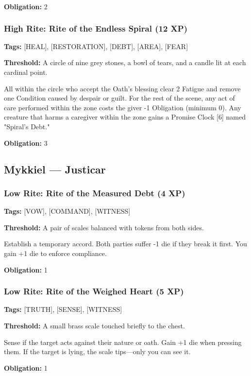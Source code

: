 \textbf{Obligation:} 2

\subsubsection{High Rite: Rite of the Endless Spiral (12 XP)}

\textbf{Tags:} [HEAL], [RESTORATION], [DEBT], [AREA], [FEAR]

\textbf{Threshold:} A circle of nine grey stones, a bowl of tears, and a candle lit at each cardinal point.

All within the circle who accept the Oath's blessing clear 2 Fatigue and remove one Condition caused by despair or guilt. For the rest of the scene, any act of care performed within the zone costs the giver -1 Obligation (minimum 0). Any creature that harms a caregiver within the zone gains a Promise Clock [6] named "Spiral's Debt."

\textbf{Obligation:} 3

\subsection{Mykkiel — Justicar}

\subsubsection{Low Rite: Rite of the Measured Debt (4 XP)}

\textbf{Tags:} [VOW], [COMMAND], [WITNESS]

\textbf{Threshold:} A pair of scales balanced with tokens from both sides.

Establish a temporary accord. Both parties suffer -1 die if they break it first. You gain +1 die to enforce compliance.

\textbf{Obligation:} 1

\subsubsection{Low Rite: Rite of the Weighed Heart (5 XP)}

\textbf{Tags:} [TRUTH], [SENSE], [WITNESS]

\textbf{Threshold:} A small brass scale touched briefly to the chest.

Sense if the target acts against their nature or oath. Gain +1 die when pressing them. If the target is lying, the scale tips—only you can see it.

\textbf{Obligation:} 1

